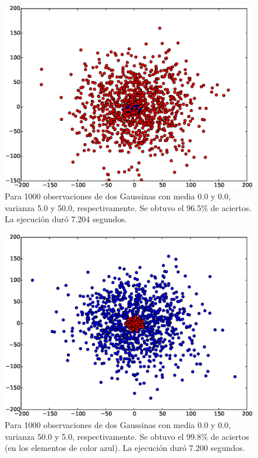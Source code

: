 \documentclass[11pt,letterpaper,reqno]{article}
\begin{document}
\begin{figure}[h]
	\centering
	\includegraphics[scale=.5]{img7}
	\caption{Para 1000 observaciones de dos Gaussinas con media 0.0 y 0.0, varianza 5.0 y 50.0, respectivamente. Se obtuvo el 96.5\% de aciertos. La ejecución duró 7.204 segundos.}
\end{figure}

\begin{figure}[h]
	\centering
	\includegraphics[scale=.5]{img8}
	\caption{Para 1000 observaciones de dos Gaussinas con media 0.0 y 0.0, varianza 50.0 y 5.0, respectivamente. Se obtuvo el 99.8\% de aciertos (en los elementos de color azul). La ejecución duró 7.200 segundos.}
\end{figure}
\end{document}
